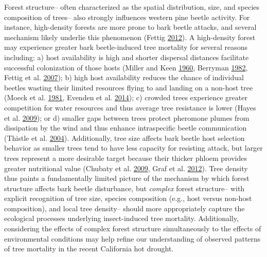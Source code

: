 \documentclass[twoside,12pt,final]{ucthesis-CA2012}
\begin{document}
\begin{ucmainmatter}
Forest structure-- often characterized as the spatial distribution,
size, and species composition of trees-- also strongly influences
western pine beetle activity. For instance, high-density forests are
more prone to bark beetle attacks, and several mechanism likely underlie
this phenomenon (Fettig \protect\hyperlink{ref-fettig2012b}{2012}). A
high-density forest may experience greater bark beetle-induced tree
mortality for several reasons including: a) host availability is high
and shorter dispersal distances facilitate successful colonization of
those hosts (Miller and Keen \protect\hyperlink{ref-miller1960}{1960},
Berryman \protect\hyperlink{ref-berryman1982}{1982}, Fettig et al.
\protect\hyperlink{ref-fettig2007}{2007}); b) high host availability
reduces the chance of individual beetles wasting their limited resources
flying to and landing on a non-host tree (Moeck et al.
\protect\hyperlink{ref-moeck1981}{1981}, Evenden et al.
\protect\hyperlink{ref-evenden2014}{2014}); c) crowded trees experience
greater competition for water resources and thus average tree resistance
is lower (Hayes et al. \protect\hyperlink{ref-hayes2009}{2009}); or d)
smaller gaps between trees protect pheromone plumes from dissipation by
the wind and thus enhance intraspecific beetle communication (Thistle et
al. \protect\hyperlink{ref-thistle2004}{2004}). Additionally, tree size
affects bark beetle host selection behavior as smaller trees tend to
have less capacity for resisting attack, but larger trees represent a
more desirable target because their thicker phloem provides greater
nutritional value (Chubaty et al.
\protect\hyperlink{ref-chubaty2009}{2009}, Graf et al.
\protect\hyperlink{ref-graf2012}{2012}). Tree density thus paints a
fundamentally limited picture of the mechanism by which forest structure
affects bark beetle disturbance, but \emph{complex} forest structure--
with explicit recognition of tree size, species composition (e.g., host
versus non-host composition), and local tree density-- should more
appropriately capture the ecological processes underlying insect-induced
tree mortality. Additionally, considering the effects of complex forest
structure simultaneously to the effects of environmental conditions may
help refine our understanding of observed patterns of tree mortality in
the recent California hot drought.


\end{ucmainmatter}
\end{document}
